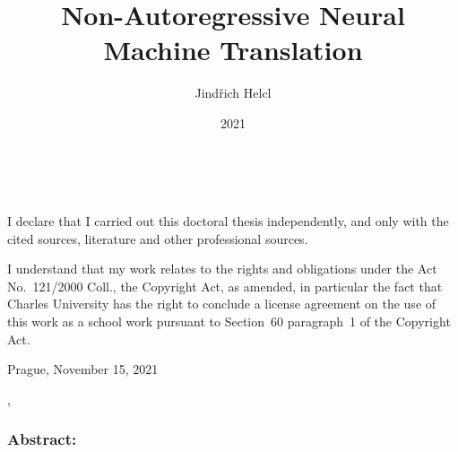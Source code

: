 \documentclass[12pt,notitlepage,a4paper,openright]{report}
\title{Non-Autoregressive Neural Machine Translation}
\author{Jindřich Helcl}
\date{2021}
\begin{document}
%
%
%
\renewcommand{\thepage}{\roman{page}}
\maketitle

\pagestyle{plain}
\normalsize %
\setcounter{page}{2} %

\cleardoublepage{}
\ \vspace{10mm}

\noindent \it

\vspace{\fill}
\noindent \rm
I declare that I carried out this doctoral thesis independently,
  and only with the cited sources, literature and other professional sources.

I understand that my work relates to the rights and obligations
  under the Act No.~121/2000 Coll., the Copyright Act, as amended,
  in particular the fact that Charles University has the right
  to conclude a license agreement on the use of this work as a school work
  pursuant to Section~60 paragraph~1 of the Copyright Act.

\vspace{2cm}
\noindent Prague, November 15, 2021 \hspace{\fill}\theauthor %


\cleardoublepage{} %
\pagestyle{plain}
{}
\begin{description}[leftmargin=7.5em,labelwidth=7em,labelindent=0em,labelsep=0.5em]
\item[Title:] \thetitle{}
\item[Author:] \theauthor{}
\item[Department:] \thedept{}
\item[Supervisor:] \thesupervisor{},\\ \thedept{}
\end{description}
\subsubsection{Abstract:}
\end{document}
